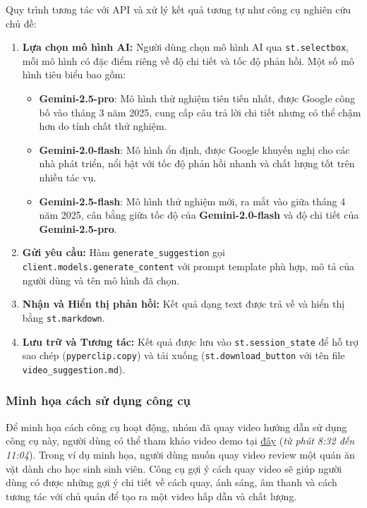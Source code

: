 \noindent
Quy trình tương tác với API và xử lý kết quả tương tự như công cụ nghiên cứu chủ đề:
\begin{enumerate}
    \item \textbf{Lựa chọn mô hình AI:} Người dùng chọn mô hình AI qua \texttt{st.selectbox}, mỗi mô hình có đặc điểm riêng về độ chi tiết và tốc độ phản hồi. Một số mô hình tiêu biểu bao gồm:
    \begin{itemize}
        \item \textbf{Gemini-2.5-pro}: Mô hình thử nghiệm tiên tiến nhất, được Google công bố vào tháng 3 năm 2025, cung cấp câu trả lời chi tiết nhưng có thể chậm hơn do tính chất thử nghiệm.
        
        \item \textbf{Gemini-2.0-flash}: Mô hình ổn định, được Google khuyến nghị cho các nhà phát triển, nổi bật với tốc độ phản hồi nhanh và chất lượng tốt trên nhiều tác vụ.
        
        \item \textbf{Gemini-2.5-flash}: Mô hình thử nghiệm mới, ra mắt vào giữa tháng 4 năm 2025, cân bằng giữa tốc độ của \textbf{Gemini-2.0-flash} và độ chi tiết của \textbf{Gemini-2.5-pro}.
    \end{itemize}

    \item \textbf{Gửi yêu cầu:} Hàm \texttt{generate\_suggestion} gọi \texttt{client.models.generate\_content} với prompt template phù hợp, mô tả của người dùng và tên mô hình đã chọn.
    
    \item \textbf{Nhận và Hiển thị phản hồi:} Kết quả dạng text được trả về và hiển thị bằng \texttt{st.markdown}.
    
    \item \textbf{Lưu trữ và Tương tác:} Kết quả được lưu vào \texttt{st.session\_state} để hỗ trợ sao chép (\texttt{pyperclip.copy}) và tải xuống (\texttt{st.download\_button} với tên file \texttt{video\_suggestion.md}).
\end{enumerate}

\subsubsection{Minh họa cách sử dụng công cụ}

Để minh họa cách công cụ hoạt động, nhóm đã quay video hướng dẫn sử dụng công cụ này, người dùng có thể tham khảo video demo tại \href{https://youtu.be/m-cdmfVc2rk?list=PL3SfxVDJ_Zc6DvBKVd6xUc-exmt0AyA7x&t=512}{đây} (\textit{từ phút 8:32 đến 11:04}). Trong ví dụ minh họa, người dùng muốn quay video review một quán ăn vặt dành cho học sinh sinh viên. Công cụ gợi ý cách quay video sẽ giúp người dùng có được những gợi ý chi tiết về cách quay, ánh sáng, âm thanh và cách tương tác với chủ quán để tạo ra một video hấp dẫn và chất lượng.

